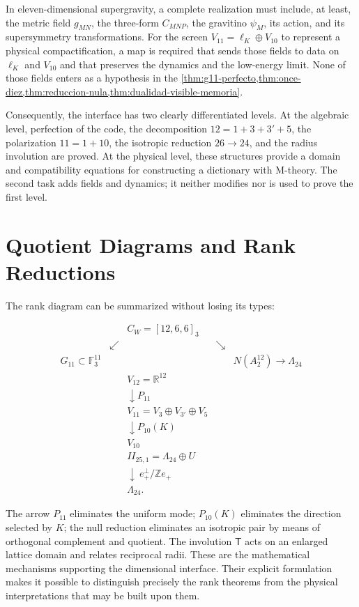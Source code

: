 In eleven-dimensional supergravity, a complete realization must include,
at least, the metric field \(g_{MN}\), the three-form \(C_{MNP}\), the
gravitino \(\psi_M\), its action, and its supersymmetry transformations. For
the screen \(V_{11}=\ell_K\oplus V_{10}\) to represent a physical
compactification, a map is required that sends those fields to data on
\(\ell_K\) and \(V_{10}\) and that preserves the dynamics and the low-energy
limit. None of those fields enters as a hypothesis in the
\cref{thm:g11-perfecto,thm:once-diez,thm:reduccion-nula,thm:dualidad-visible-memoria}.

Consequently, the interface has two clearly differentiated levels. At the algebraic level, perfection of the code, the decomposition \(12=1+3+3'+5\), the polarization \(11=1+10\), the isotropic reduction \(26\to24\), and the radius involution are proved. At the physical level, these structures provide a domain and compatibility equations for constructing a dictionary with M-theory. The second task adds fields and dynamics; it neither modifies nor is used to prove the first level.

\section{Quotient Diagrams and Rank Reductions}
\label{sec:sintesis-pantallas}

The rank diagram can be summarized without losing its types:

\[
\begin{array}{ccccc}
&&C_W=[12,6,6]_3&&\\[1mm]
&\swarrow&&\searrow&\\[-1mm]
G_{11}\subset\mathbb F_3^{11}&&&&N(A_2^{12})\longrightarrow\Lambda_{24}\\[2mm]
&&V_{12}=\mathbb R^{12}&&\\[-1mm]
&&\downarrow P_{11}&&\\[-1mm]
&&V_{11}=V_3\oplus V_{3'}\oplus V_5&&\\[-1mm]
&&\downarrow P_{10}(K)&&\\[-1mm]
&&V_{10}&&\\[2mm]
&&II_{25,1}=\Lambda_{24}\oplus U&&\\[-1mm]
&&\downarrow\ e_+^\perp/\mathbb Ze_+&&\\[-1mm]
&&\Lambda_{24}.&&
\end{array}
\]

The arrow \(P_{11}\) eliminates the uniform mode; \(P_{10}(K)\) eliminates the
direction selected by \(K\); the null reduction eliminates an
isotropic pair by means of orthogonal complement and quotient. The involution
\(\mathsf T\) acts on an enlarged lattice domain and relates reciprocal
radii. These are the mathematical mechanisms supporting the dimensional
interface. Their explicit formulation makes it possible to distinguish precisely the
rank theorems from the physical interpretations that may be built
upon them.
